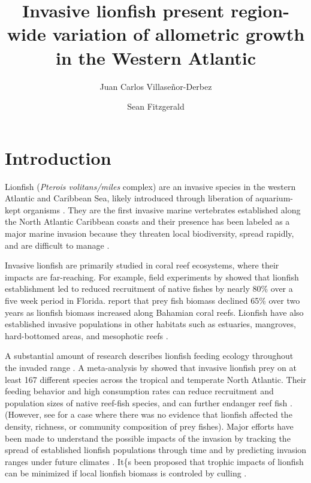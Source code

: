 \documentclass[fleqn,10pt,lineno]{wlpeerj} %
\title{Invasive lionfish present region-wide variation of allometric growth in
the Western Atlantic}
\author[1]{Juan Carlos Villaseñor-Derbez}
\author[1]{Sean Fitzgerald}
\affil[1]{Bren School of Environmental Sciences and Management, University of California
  Santa Barbara, Santa Barbara, California, USA}
\begin{document}
\flushbottom
\maketitle
\thispagestyle{empty}

\section*{Introduction}

Lionfish (\emph{Pterois volitans/miles} complex) are an invasive species
in the western Atlantic and Caribbean Sea, likely introduced through
liberation of aquarium-kept organisms \citep{betancurr_2011}. They are
the first invasive marine vertebrates established along the North
Atlantic Caribbean coasts
\citep{schofield_2009,schofield_2010,sabidoitza_2016} and their presence
has been labeled as a major marine invasion because they threaten local
biodiversity, spread rapidly, and are difficult to manage
\citep{hixon_2016}.

Invasive lionfish are primarily studied in coral reef ecosystems, where
their impacts are far-reaching. For example, field experiments by
\citet{albins_2008} showed that lionfish establishment led to reduced
recruitment of native fishes by nearly 80\% over a five week period in
Florida. \citet{green_2012} report that prey fish biomass declined 65\%
over two years as lionfish biomass increased along Bahamian coral reefs.
Lionfish have also established invasive populations in other habitats
such as estuaries, mangroves, hard-bottomed areas, and mesophotic reefs
\citep{jud_2011,barbour_2010,muoz_2011,andradibrown_2017,claydon_2012}.

A substantial amount of research describes lionfish feeding ecology
throughout the invaded range
\citep{muoz_2011,morris_2009,cote_2013,dahl_2014,valdezmoreno_2012,villaseorderbez_2014,hackerott_2017,sandel_2015}.
A meta-analysis by \citet{peake_2018} showed that invasive lionfish prey
on at least 167 different species across the tropical and temperate
North Atlantic. Their feeding behavior and high consumption rates can
reduce recruitment and population sizes of native reef-fish species, and
can further endanger reef fish
\citep{albins_2008, green_2012,rocha_2015}. (However, see
\citet{hackerott_2017} for a case where there was no evidence that
lionfish affected the density, richness, or community composition of
prey fishes). Major efforts have been made to understand the possible
impacts of the invasion by tracking the spread of established lionfish
populations through time \citep{schofield_2009,schofield_2010} and by
predicting invasion ranges under future climates \citep{grieve_2016}.
It\{s been proposed that trophic impacts of lionfish can be minimized if
local lionfish biomass is controled by culling
\citep{ariasgonzalez_2011}.
\end{document}
